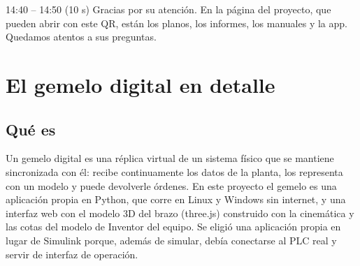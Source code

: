 \documentclass[11pt,a4paper]{article}
\begin{document}
\begin{guion}{14:40 -- 14:50 \quad (10 s)}
Gracias por su atención. En la página del proyecto, que pueden abrir con este QR, están los planos, los informes, los manuales y la app. Quedamos atentos a sus preguntas.
\end{guion}
\clearpage

\section{El gemelo digital en detalle}
\subsection{Qué es}
Un gemelo digital es una réplica virtual de un sistema físico que se mantiene sincronizada con él: recibe
continuamente los datos de la planta, los representa con un modelo y puede devolverle órdenes. En este proyecto
el gemelo es una aplicación propia en Python, que corre en Linux y Windows sin internet, y una interfaz web con
el modelo 3D del brazo (three.js) construido con la cinemática y las cotas del modelo de Inventor del equipo.
Se eligió una aplicación propia en lugar de Simulink porque, además de simular, debía conectarse al PLC real y
servir de interfaz de operación.
\end{document}
